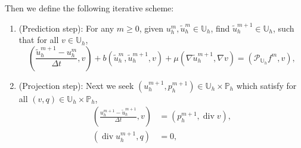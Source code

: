 \documentclass[10pt,letterpaper]{amsart}
\newcommand{\tu}{\widetilde{u}}
\newcommand{\Grad}{\nabla}
\newcommand{\Div}{\operatorname{div}}
\newcommand{\Ph}{\mathbb{P}_h}
\newcommand{\Uh}{\mathbb{U}_h}
\newcommand{\PUh}{\mathcal{P}_{\Uh}}
\theoremstyle{definition}{\newtheorem{definition}[lemma]{Definition}}
\numberwithin{equation}{section}
\begin{document}
Then we define the following iterative scheme: 
\begin{enumerate}
	\item[{\bf Step 1}] (Prediction step):
	For any $m\geq 0$, given $ u_h^{m},\tu_h^m \in \Uh $, find $\tu_h^{m+1} \in \Uh $, such that for all $v\in \Uh $,
	\begin{equation}
		\label{eq:step1fully}
	\left(\frac{\tu^{m+1}_h-u^m_h}{\Delta t},v\right)+ b(\tu^m_h,\tu^{m+1}_h,v)+\mu(\Grad \tu_h^{m+1},\Grad v)= (\PUh f^{m}, v),
	\end{equation}
\item[{\bf Step 2}] (Projection step): Next we seek $(u^{m+1}_h,p^{m+1}_h)\in \Uh\times\Ph$ which satisfy for all $(v,q)\in \Uh\times\Ph$,
\begin{subequations}
	\label{eq:projectionfullydiscrete}
	\begin{align}
	\label{eq:projection1}
	\left(\frac{u^{m+1}_h-\tu^{m+1}_h}{\Delta t }, v\right)&= ( p^{m+1}_h,\Div v),\\
\label{eq:projection2}
	\left(\Div u^{m+1}_h,q\right)&=0,	
	\end{align}	
\end{subequations}
\end{enumerate}
\end{document}
